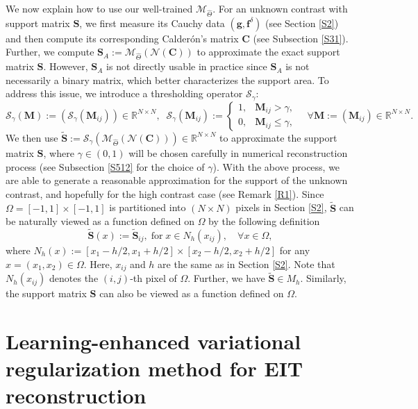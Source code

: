 \documentclass[11pt]{article}
\newcommand{\R}{{\mathbb R}}
\newcommand{\g}{\gamma}
\newcommand{\Calderon}{Calder\'{o}n}
\newcommand{\bds}[1]{\boldsymbol{#1}}
\begin{document}
We now explain how to use our well-trained $\mathcal{M}_{\widehat{\Theta}}$.
For an unknown contrast with support matrix $\bds{S}$, we first measure its Cauchy data $ (\bds{g}, \bds{f}^\delta) $ (see Section \ref{S2}) and then compute its corresponding \Calderon's matrix $\bds{C}$ (see Subsection \ref{S31}). 
Further, we compute $ \bds{S}_A := \mathcal{M}_{\widehat{\Theta}}(\mathcal{N}(\bds{C})) $ to approximate the exact support matrix $\bds{S}$.
However, $ \bds{S}_A $ is not directly usable in practice since $ \bds{S}_A $ is not necessarily a binary matrix, which better characterizes the support area.
To address this issue, we introduce a thresholding operator $\mathcal{S}_\gamma$:
\begin{equation}\label{49}
\mathcal{S}_\g(\bds{M}):=(\mathcal{S}_\g(\bds{M}_{ij}))\in\R^{N\times N},\;\;
\mathcal{S}_\gamma(\bds{M}_{ij}):=\left\{ \begin{array}{ll}
1, & \bds{M}_{ij}>\gamma,\\
0, & \bds{M}_{ij}\leq\gamma,
\end{array} \right.
\quad \forall\bds{M}:=(\bds{M}_{ij})\in\mathbb{R}^{N\times N}.
\end{equation}
We then use $ \widetilde{\bds{S}} := \mathcal{S}_\gamma(\mathcal{M}_{\widehat{\Theta}}(\mathcal{N}(\bds{C})))\in \R^{N\times N} $ to approximate the support matrix $\bds{S}$, where $\gamma\in (0,1)$ will be chosen carefully in numerical reconstruction process (see Subsection \ref{S512} for the choice of $\gamma$).
With the above process, we are able to generate a reasonable approximation for the support of the unknown contrast, and hopefully for the high contrast case (see Remark \ref{R1}).
Since $\Omega = [-1,1]\times [-1,1]$ is partitioned into $ (N\times N) $ pixels in Section \ref{S2}, $ \widetilde{\bds{S}} $ can be naturally viewed as a function defined on $ \Omega $ by the following definition
\begin{equation}\label{50}
\widetilde{\bds{S}}(x) := \widetilde{\bds{S}}_{ij},\; \text{for}\; x\in N_h(x_{ij}) ,\quad \forall x\in \Omega,
\end{equation}
where $ N_h(x):= [x_1-h/2, x_1+h/2]\times [x_2-h/2, x_2+h/2] $ for any $ x = (x_1, x_2)\in\Omega $.
Here, $ x_{ij} $ and $ h $ are the same as in Section \ref{S2}.
Note that $ N_h(x_{ij}) $ denotes the $ (i,j) $-th pixel of $\Omega$.
Further, we have $ \widetilde{\bds{S}}\in M_h $.
Similarly, the support matrix $ \bds{S} $ can also be viewed as a function defined on $\Omega$.

\section{Learning-enhanced variational regularization method for EIT reconstruction}\label{S4}
\setcounter{equation}{0}
\end{document}
